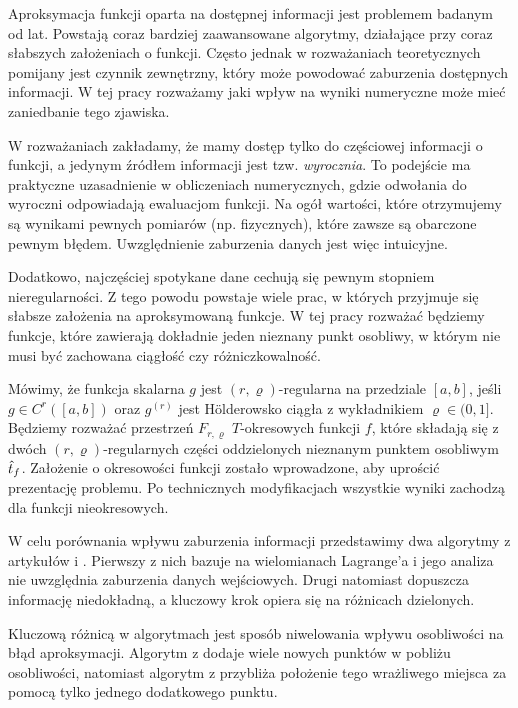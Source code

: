 \documentclass[oik, pdftex, man]{mgrwms}
\begin{document}
\begin{wstep}[Wprowadzenie]
    Aproksymacja funkcji oparta na dostępnej informacji jest problemem badanym od lat. Powstają coraz bardziej zaawansowane algorytmy, działające przy coraz słabszych założeniach o funkcji. Często jednak w rozważaniach teoretycznych pomijany jest czynnik zewnętrzny, który może powodować zaburzenia dostępnych informacji. W tej pracy rozważamy jaki wpływ na wyniki numeryczne może mieć zaniedbanie tego zjawiska.

    W rozważaniach zakładamy, że mamy dostęp tylko do częściowej informacji o funkcji, a jedynym źródłem informacji jest tzw. \textit{wyrocznia}. To podejście ma praktyczne uzasadnienie w obliczeniach numerycznych, gdzie odwołania do wyroczni odpowiadają ewaluacjom funkcji. Na ogół wartości, które otrzymujemy są wynikami pewnych pomiarów (np. fizycznych), które zawsze są obarczone pewnym błędem. Uwzględnienie zaburzenia danych jest więc intuicyjne.
    
    Dodatkowo, najczęściej spotykane dane cechują się pewnym stopniem nieregularności. Z tego powodu powstaje wiele prac, w których przyjmuje się słabsze założenia na aproksymowaną funkcje. W tej pracy rozważać będziemy funkcje, które zawierają dokładnie jeden nieznany punkt osobliwy, w którym nie musi być zachowana ciągłość czy różniczkowalność.

    Mówimy, że funkcja skalarna $g$ jest $(r, \varrho)$-regularna na przedziale $[a,b]$, jeśli $g \in C^{r}([a,b])$ oraz $g^{(r)}$ jest Hölderowsko ciągła z wykładnikiem $\varrho \in (0,1]$. Będziemy rozważać przestrzeń $F_{r,\varrho}$ $T$-okresowych funkcji $f$, które składają się z dwóch $(r,\varrho)$-regularnych części oddzielonych nieznanym punktem osobliwym $\hat{t}_{f}$. Założenie o okresowości funkcji zostało wprowadzone, aby uprościć prezentację problemu. Po technicznych modyfikacjach wszystkie wyniki zachodzą dla funkcji nieokresowych.

    W celu porównania wpływu zaburzenia informacji przedstawimy dwa algorytmy z artykułów \cite{CoDF} i \cite{AoP}. Pierwszy z nich bazuje na wielomianach Lagrange'a i jego analiza nie uwzględnia zaburzenia danych wejściowych. Drugi natomiast dopuszcza informację niedokładną, a kluczowy krok opiera się na różnicach dzielonych.

    Kluczową różnicą w algorytmach jest sposób niwelowania wpływu osobliwości na błąd aproksymacji. Algorytm z \cite{CoDF} dodaje wiele nowych punktów w pobliżu osobliwości, natomiast algorytm z \cite{AoP} przybliża położenie tego wrażliwego miejsca za pomocą tylko jednego dodatkowego punktu.


\end{wstep}
\end{document}
